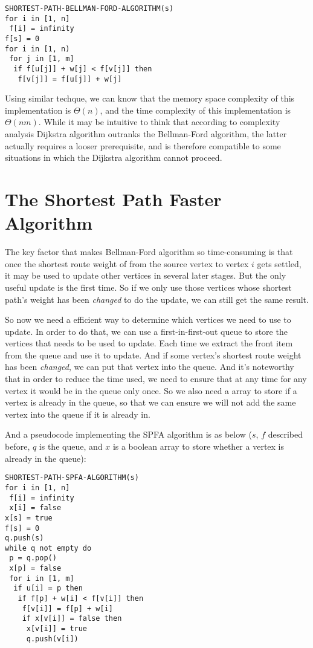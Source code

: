 \documentclass[a4paper,11pt,twocolumn]{article}
\begin{document}
\begin{verbatim}
SHORTEST-PATH-BELLMAN-FORD-ALGORITHM(s)
for i in [1, n]
 f[i] = infinity
f[s] = 0
for i in [1, n)
 for j in [1, m]
  if f[u[j]] + w[j] < f[v[j]] then
   f[v[j]] = f[u[j]] + w[j]
\end{verbatim}

Using similar techque, we can know that the memory space complexity of this implementation is $\Theta(n)$, and the time complexity of this implementation is $\Theta(nm)$. While it may be intuitive to think that according to complexity analysis Dijkstra algorithm outranks the Bellman-Ford algorithm, the latter actually requires a looser prerequisite, and is therefore compatible to some situations in which the Dijkstra algorithm cannot proceed.

\section{The Shortest Path Faster Algorithm}

The key factor that makes Bellman-Ford algorithm so time-consuming is that once the shortest route weight of from the source vertex to vertex $i$ gets settled, it may be used to update other vertices in several later stages. But the only useful update is the first time. So if we only use those vertices whose shortest path's weight has been \emph{changed} to do the update, we can still get the same result.

So now we need a efficient way to determine which vertices we need to use to update. In order to do that, we can use a first-in-first-out queue to store the vertices that needs to be used to update. Each time we extract the front item from the queue and use it to update. And if some vertex's shortest route weight has been \emph{changed}, we can put that vertex into the queue. And it's noteworthy that in order to reduce the time used, we need to ensure that at any time for any vertex it would be in the queue only once. So we also need a array to store if a vertex is already in the queue, so that we can ensure we will not add the same vertex into the queue if it is already in.

And a pseudocode implementing the SPFA algorithm is as below ($s$, $f$ described before, $q$ is the queue, and $x$ is a boolean array to store whether a vertex is already in the queue):

\begin{verbatim}
SHORTEST-PATH-SPFA-ALGORITHM(s)
for i in [1, n]
 f[i] = infinity
 x[i] = false
x[s] = true
f[s] = 0
q.push(s)
while q not empty do
 p = q.pop()
 x[p] = false
 for i in [1, m]
  if u[i] = p then
   if f[p] + w[i] < f[v[i]] then
    f[v[i]] = f[p] + w[i]
    if x[v[i]] = false then
     x[v[i]] = true
     q.push(v[i])
\end{verbatim}
\end{document}
